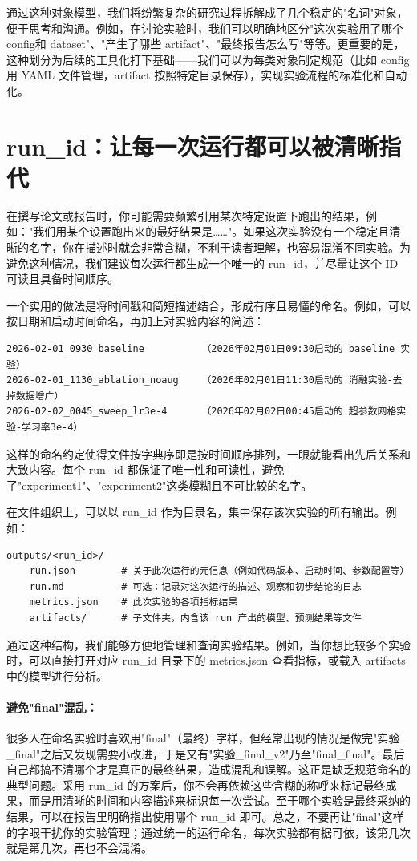 通过这种对象模型，我们将纷繁复杂的研究过程拆解成了几个稳定的"名词"对象，便于思考和沟通。例如，在讨论实验时，我们可以明确地区分"这次实验用了哪个 config和 dataset"、"产生了哪些 artifact"、"最终报告怎么写"等等。更重要的是，这种划分为后续的工具化打下基础——我们可以为每类对象制定规范（比如 config 用 YAML 文件管理，artifact 按照特定目录保存），实现实验流程的标准化和自动化。

\section{run\_id：让每一次运行都可以被清晰指代}

在撰写论文或报告时，你可能需要频繁引用某次特定设置下跑出的结果，例如："我们用某个设置跑出来的最好结果是……"。如果这次实验没有一个稳定且清晰的名字，你在描述时就会非常含糊，不利于读者理解，也容易混淆不同实验。为避免这种情况，我们建议每次运行都生成一个唯一的 run\_id，并尽量让这个 ID 可读且具备时间顺序。

一个实用的做法是将时间戳和简短描述结合，形成有序且易懂的命名。例如，可以按日期和启动时间命名，再加上对实验内容的简述：

\begin{verbatim}
2026-02-01_0930_baseline          （2026年02月01日09:30启动的 baseline 实验）
2026-02-01_1130_ablation_noaug    （2026年02月01日11:30启动的 消融实验-去掉数据增广）
2026-02-02_0045_sweep_lr3e-4      （2026年02月02日00:45启动的 超参数网格实验-学习率3e-4）
\end{verbatim}

这样的命名约定使得文件按字典序即是按时间顺序排列，一眼就能看出先后关系和大致内容。每个 run\_id 都保证了唯一性和可读性，避免了"experiment1"、"experiment2"这类模糊且不可比较的名字。

在文件组织上，可以以 run\_id 作为目录名，集中保存该次实验的所有输出。例如：

\begin{verbatim}
outputs/<run_id>/
    run.json        # 关于此次运行的元信息（例如代码版本、启动时间、参数配置等）
    run.md          # 可选：记录对这次运行的描述、观察和初步结论的日志
    metrics.json    # 此次实验的各项指标结果
    artifacts/      # 子文件夹，内含该 run 产出的模型、预测结果等文件
\end{verbatim}

通过这种结构，我们能够方便地管理和查询实验结果。例如，当你想比较多个实验时，可以直接打开对应 run\_id 目录下的 metrics.json 查看指标，或载入 artifacts 中的模型进行分析。

\paragraph{避免"final"混乱：} 很多人在命名实验时喜欢用"final"（最终）字样，但经常出现的情况是做完"实验\_final"之后又发现需要小改进，于是又有"实验\_final\_v2"乃至"final\_final"。最后自己都搞不清哪个才是真正的最终结果，造成混乱和误解。这正是缺乏规范命名的典型问题。采用 run\_id 的方案后，你不会再依赖这些含糊的称呼来标记最终成果，而是用清晰的时间和内容描述来标识每一次尝试。至于哪个实验是最终采纳的结果，可以在报告里明确指出使用哪个 run\_id 即可。总之，不要再让"final"这样的字眼干扰你的实验管理；通过统一的运行命名，每次实验都有据可依，该第几次就是第几次，再也不会混淆。

